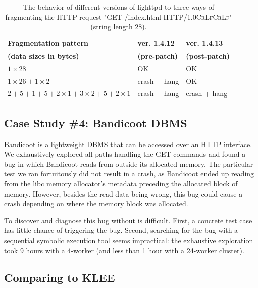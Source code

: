 \begin{table}
\small
\centering
\begin{tabular}{| p{3.8cm} | p{1.65cm} | p{1.65cm} |}
\hline
\bf Fragmentation pattern & \bf ver. 1.4.12 & \bf ver. 1.4.13 \\
\bf (data sizes in bytes) & \bf (pre-patch)     & \bf (post-patch)\\
\hline
$1 \times 28$ 			& 		OK		& OK \\
\hline
$1 \times 26 + 1 \times 2$  & crash + hang 	& OK \\
\hline
$2+5+1+5+2 \times 1 + 3 \times 2 + 5 + 2 \times 1 $	& crash + hang 	& crash + hang \\
\hline
\end{tabular}
\caption{The behavior of different versions of lighttpd to three ways of fragmenting the HTTP request "GET /index.html HTTP/1.0\textsc{Cr}\textsc{Lf}\textsc{Cr}\textsc{Lf}" (string length 28).}
\label{table:lighttpd}
\end{table}

\subsection{Case Study \#4: Bandicoot DBMS}
\label{sec:eval:bandicoot}

Bandicoot is a lightweight DBMS that can be accessed over an HTTP interface.  We exhaustively explored all paths handling the GET commands and found a bug in which Bandicoot reads from outside its allocated memory.  The particular test we ran fortuitously did not result in a crash, as Bandicoot ended up reading from the libc memory allocator's metadata preceding the allocated block of memory. However, besides the read data being wrong, this bug could cause a crash depending on where the memory block was allocated.

To discover and diagnose this bug without \cnine is difficult. First, a concrete test case has little chance of triggering the bug.  Second, searching for the bug with a sequential symbolic execution tool seems impractical: the exhaustive exploration took 9 hours with a 4-worker \cnine (and less than 1 hour with a 24-worker cluster). 

\subsection{Comparing \cnine to KLEE}

